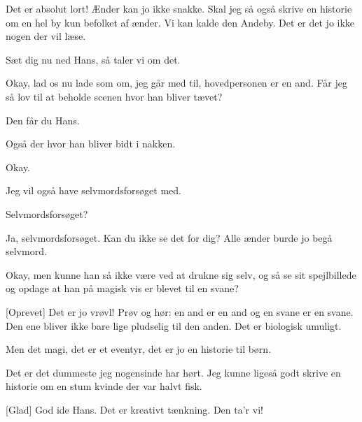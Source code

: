 \documentclass[a4paper,11pt]{article}
\begin{document}
\begin{sketch}
 Det er absolut lort! Ænder kan jo ikke snakke. Skal jeg så også skrive en historie om en hel by kun befolket af ænder. Vi kan kalde den Andeby. Det er det jo ikke nogen der vil læse. 

  Sæt dig nu ned Hans, så taler vi om det.

  Okay, lad os nu lade som om, jeg går med til, hovedpersonen er en and. Får jeg så lov til at beholde scenen hvor han bliver tævet?

  Den får du Hans.

 Også der hvor han bliver bidt i nakken.

  Okay.

 Jeg vil også have selvmordsforsøget med. %

  Selvmordsforsøget? 

 Ja, selvmordsforsøget. Kan du ikke se det for dig? Alle ænder burde jo begå selvmord.

  Okay, men kunne han så ikke være ved at drukne sig selv, og så se sit spejlbillede og opdage at han på magisk vis er blevet til en svane?

[Oprevet] Det er jo vrøvl! Prøv og hør: en and er en and og en svane er en svane. Den ene bliver ikke bare lige pludselig til den anden. Det er biologisk umuligt. 

  Men det magi, det er et eventyr, det er jo en historie til børn.

 Det er det dummeste jeg nogensinde har hørt. Jeg kunne ligeså godt skrive en historie om en stum kvinde der var halvt fisk.

 [Glad] God ide Hans. Det er kreativt tænkning. Den ta'r vi!








\end{sketch}
\end{document}
